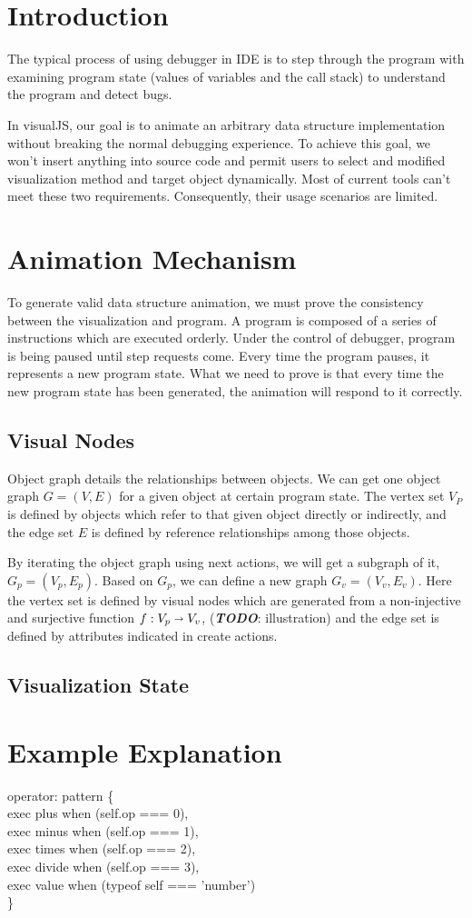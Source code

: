 \documentclass[11pt]{article}
\begin{document}
\section{Introduction}
The typical process of using debugger in IDE is to step through the program with examining program state (values of variables and the call stack) to understand the program and detect bugs.

\noindent In visualJS, our goal is to animate an arbitrary data structure implementation without breaking the normal debugging experience. To achieve this goal, we won't insert anything into source code and permit users to select and modified visualization method and target object dynamically. Most of current tools can't meet these two requirements. Consequently, their  usage scenarios are limited. 

\section{Animation Mechanism}
To generate valid data structure animation, we must prove the consistency between the visualization and program. A program is composed of a series of instructions which are executed orderly. Under the control of debugger, program is being paused until step requests come. Every time the program pauses, it represents a new program state. What we need to prove is that every time the new program state has been generated, the animation will respond to it correctly.

\subsection{Visual Nodes}
Object graph details the relationships between objects. We can get one object graph \(G = (V, E)\) for a given object at certain program state. The vertex set $V_P$ is defined by objects which refer to that given object directly or indirectly, and the edge set $E$ is defined by reference relationships among those objects.

\noindent By iterating the object graph using next actions, we will get a subgraph of it, \(G_p = (V_p, E_p)\). Based on $G_p$, we can define a new graph \(G_v = (V_v, E_v)\). Here the vertex set is defined by visual nodes which are generated from a non-injective and surjective function \(f:V_p\shortrightarrow V_v\), (\textbf{\textit{TODO}}: illustration) and the edge set is defined by attributes indicated in create actions.

\subsection{Visualization State}

\section{Example Explanation}
operator: pattern \{
\\\indent exec plus when (self.op === 0),
\\\indent exec minus when (self.op === 1),
\\\indent exec times when (self.op === 2),
\\\indent exec divide when (self.op === 3),
\\\indent exec value when (typeof self === 'number')
\\ \}
\end{document}
